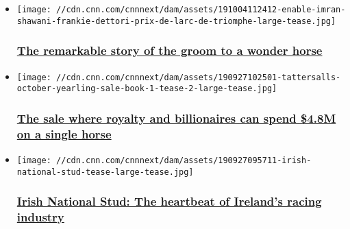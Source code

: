 \begin{itemize}
\item
  \href{/2019/10/04/sport/enable-prix-de-larc-de-triomphe-imran-shawani-spt-intl/index.html}{}

  \texttt{[image: //cdn.cnn.com/cnnnext/dam/assets/191004112412-enable-imran-shawani-frankie-dettori-prix-de-larc-de-triomphe-large-tease.jpg]}

  \hypertarget{the-remarkable-story-of-the-groom-to-a-wonder-horse}{%
  \subsubsection{\texorpdfstring{\href{/2019/10/04/sport/enable-prix-de-larc-de-triomphe-imran-shawani-spt-intl/index.html}{The
  remarkable story of the groom to a wonder
  horse}}{The remarkable story of the groom to a wonder horse}}\label{the-remarkable-story-of-the-groom-to-a-wonder-horse}}
\end{itemize}

\begin{itemize}
\item
  \href{/2019/09/27/sport/tattersalls-horse-racing-sale-of-the-century-spt-intl/index.html}{}

  \texttt{[image: //cdn.cnn.com/cnnnext/dam/assets/190927102501-tattersalls-october-yearling-sale-book-1-tease-2-large-tease.jpg]}

  \hypertarget{the-sale-where-royalty-and-billionaires-can-spend-48m-on-a-single-horse}{%
  \subsubsection{\texorpdfstring{\href{/2019/09/27/sport/tattersalls-horse-racing-sale-of-the-century-spt-intl/index.html}{The
  sale where royalty and billionaires can spend \$4.8M on a single
  horse}}{The sale where royalty and billionaires can spend \$4.8M on a single horse}}\label{the-sale-where-royalty-and-billionaires-can-spend-48m-on-a-single-horse}}
\end{itemize}

\begin{itemize}
\item
  \href{/2019/09/30/sport/irish-national-stud-winning-post-spt-intl/index.html}{}

  \texttt{[image: //cdn.cnn.com/cnnnext/dam/assets/190927095711-irish-national-stud-tease-large-tease.jpg]}

  \hypertarget{irish-national-stud-the-heartbeat-of-irelands-racing-industry-}{%
  \subsubsection{\texorpdfstring{\href{/2019/09/30/sport/irish-national-stud-winning-post-spt-intl/index.html}{Irish
  National Stud: The heartbeat of Ireland's racing industry
  }}{Irish National Stud: The heartbeat of Ireland's racing industry }}\label{irish-national-stud-the-heartbeat-of-irelands-racing-industry-}}
\end{itemize}

